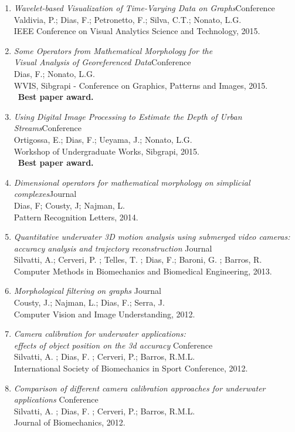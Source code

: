 \documentclass[12pt]{article}
\newcommand{\pub}[4]{
  {\emph{#1}\hfill{\small#2}\\
    #3\\
    #4}}
\begin{document}
\begin{enumerate}
\item{
  \pub
      {Wavelet-based Visualization of Time-Varying Data on Graphs}{Conference}
      {Valdivia, P.; Dias, F.; Petronetto, F.; Silva, C.T.; Nonato, L.G.}
      {IEEE Conference on Visual Analytics Science and Technology, 2015.}
}
\item{
  \pub
      {Some Operators from Mathematical Morphology for the \\ Visual Analysis of Georeferenced Data}{Conference}
      {Dias, F.; Nonato, L.G.}
      {WVIS, Sibgrapi - Conference on Graphics, Patterns and Images, 2015.}
      \\~\textbf{Best paper award.}
} 
\item{
  \pub
      {Using Digital Image Processing to Estimate the Depth of Urban Streams}{Conference}
      {Ortigossa, E.; Dias, F.; Ueyama, J.; Nonato, L.G.}
      {Workshop of Undergraduate Works, Sibgrapi, 2015.}
      \\~\textbf{Best paper award.}
}
  
\item{
  \pub
      {Dimensional operators for mathematical morphology on simplicial complexes}{Journal}
      {Dias, F; Cousty, J; Najman, L.}
      {Pattern  Recognition Letters, 2014.}
}

\item{
  \pub
    {Quantitative underwater 3D motion analysis using submerged video cameras: \\
    accuracy analysis and trajectory reconstruction }{ Journal}
    {Silvatti, A.; Cerveri, P. ; Telles, T. ; Dias, F.; Baroni, G. ; Barros, R.}
    {Computer Methods in Biomechanics and Biomedical Engineering, 2013.}
}
  
\item{
  \pub
      {Morphological filtering on graphs }{ Journal}
      {Cousty, J.; Najman, L.; Dias, F.; Serra, J.}
      {Computer Vision and Image Understanding, 2012.}
}

\item{
  \pub
      {Camera calibration for underwater applications:\\
        effects of object position on the 3d accuracy }{ Conference}
      {Silvatti, A. ; Dias, F. ; Cerveri, P.; Barros, R.M.L.}
      {International Society of Biomechanics in Sport Conference, 2012.}
}

\item{
  \pub
      {Comparison of different camera calibration approaches for underwater applications }{ Conference}
      {Silvatti, A. ; Dias, F. ; Cerveri, P.; Barros, R.M.L.}
      {Journal of Biomechanics, 2012.}
}


\end{enumerate}
\end{document}
